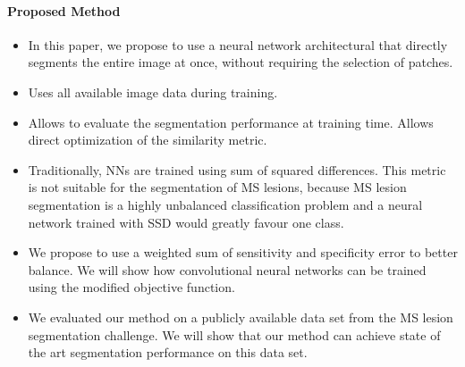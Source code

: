 \paragraph{Proposed Method}

\begin{itemize}
\item In this paper, we propose to use a neural network architectural that directly
segments the entire image at once, without requiring the selection of patches. 

\item Uses all available image data during training. 

\item Allows to evaluate the segmentation performance at training time. Allows
direct optimization of the similarity metric.

\item Traditionally, NNs are trained using sum of squared differences. This
metric is not suitable for the segmentation of MS lesions, because MS lesion
segmentation is a highly unbalanced classification problem and a neural network
trained with SSD would greatly favour one class.

\item We propose to use a weighted sum of sensitivity and specificity error to
better balance. We will show how convolutional neural networks can be trained
using the modified objective function.

\item We evaluated our method on a publicly available data set from the MS
lesion segmentation challenge. We will show that our method can achieve state of
the art segmentation performance on this data set.
\end{itemize}
